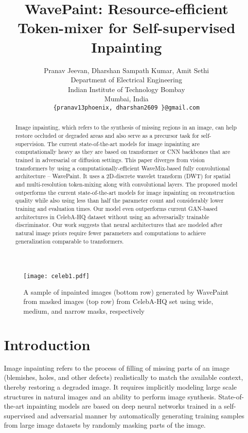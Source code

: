 \documentclass{article}
\title{WavePaint: Resource-efficient Token-mixer for Self-supervised Inpainting
}
\author{
  Pranav Jeevan, Dharshan Sampath Kumar, Amit Sethi \\
  Department of Electrical Engineering \\
  Indian Institute of Technology Bombay \\
  Mumbai, India\\
  \texttt{\{pranav13phoenix, dharshan2609 \}@gmail.com} \\
}
\begin{document}
\maketitle


\begin{abstract}
Image inpainting, which refers to the synthesis of missing regions in an image, can help restore occluded or degraded areas and also serve as a precursor task for self-supervision. The current state-of-the-art models for image inpainting are computationally heavy as they are based on transformer or CNN backbones that are trained in adversarial or diffusion settings. This paper diverges from vision transformers by using a computationally-efficient WaveMix-based fully convolutional architecture -- WavePaint. It uses a 2D-discrete wavelet transform (DWT) for spatial and multi-resolution token-mixing along with convolutional layers. The proposed model outperforms the current state-of-the-art models for image inpainting on reconstruction quality while also using less than half the parameter count and considerably lower training and evaluation times. Our model even outperforms current GAN-based architectures in CelebA-HQ dataset without using an adversarially trainable discriminator. Our work suggests that neural architectures that are modeled after natural image priors require fewer parameters and computations to achieve generalization comparable to transformers.
\end{abstract}








\begin{figure}[b]
\centering
\texttt{[image: celeb1.pdf]}
\caption{A sample of inpainted images (bottom row) generated by WavePaint from masked images (top row) from CelebA-HQ set using wide, medium, and narrow masks, respectively}
\label{fig:pics}
\end{figure}

\section{Introduction}
\label{sec:intro}


Image inpainting refers to the process of filling of missing parts of an image (blemishes, holes, and other defects) realistically to match the available context, thereby restoring a degraded image. It requires implicitly modeling large scale structures in natural images and an ability to perform image synthesis. State-of-the-art inpainting models are based on deep neural networks trained in a self-supervised and adversarial manner by automatically generating training samples from large image datasets by randomly masking parts of the image. 
\end{document}

